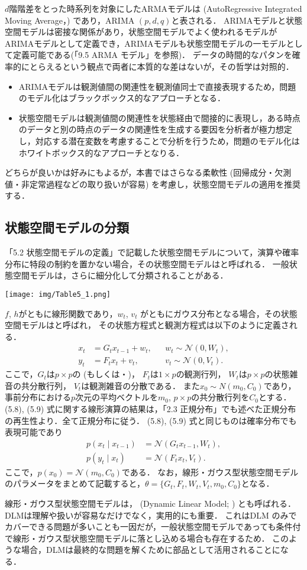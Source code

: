 \documentclass[11pt,a4paper]{jsarticle}
\numberwithin{equation}{section}
\begin{document}
$d$階階差をとった時系列を対象にしたARMAモデルは (AutoRegressive Integrated Moving Average，) であり，ARIMA $(p, d, q)$と表される．
ARIMAモデルと状態空間モデルは密接な関係があり，状態空間モデルでよく使われるモデルがARIMAモデルとして定義でき，ARIMAモデルも状態空間モデルの一モデルとして定義可能である(「9.5 ARMA モデル」を参照)．
データの時間的なパタンを確率的にとらえるという観点で両者に本質的な差はないが，その哲学は対照的．
\begin{itemize}
\item ARIMAモデルは観測値間の関連性を観測値同士で直接表現するため，問題のモデル化はブラックボックス的なアプローチとなる．
\item 状態空間モデルは観測値間の関連性を状態経由で間接的に表現し，ある時点のデータと別の時点のデータの関連性を生成する要因を分析者が極力想定し，対応する潜在変数を考慮することで分析を行うため，問題のモデル化はホワイトボックス的なアプローチとなりる．
\end{itemize}
どちらが良いかは好みにもよるが，本書ではさらなる柔軟性 (回帰成分・欠測値・非定常過程などの取り扱いが容易) を考慮し，状態空間モデルの適用を推奨する．

\subsection{状態空間モデルの分類}
「5.2 状態空間モデルの定義」で記載した状態空間モデルについて，演算や確率分布に特段の制約を置かない場合，その状態空間モデルはと呼ばれる．
一般状態空間モデルは，さらに細分化して分類されることがある．
\begin{center}
\texttt{[image: img/Table5\_1.png]}
\end{center}

$f$, $h$がともに線形関数であり，$w_t$, $v_t$ がともにガウス分布となる場合，その状態空間モデルはと呼ばれ，
その状態方程式と観測方程式は以下のように定義される．
\begin{align}
x_t
& =
G_t x_{t-1} + w_t, && w_t \sim \mathcal{N} (0, W_t), \\
y_t
& =
F_t x_t + v_t, && v_t \sim \mathcal{N} (0, V_t).
\end{align}
ここで，$G_t$は$p \times p$の (もしくは・)，
$F_t$は$1 \times p$の観測行列，
$W_t$は$p \times p$の状態雑音の共分散行列，
$V_t$は観測雑音の分散である．
また$x_0 \sim N(m_0, C_0)$であり，事前分布における$p$次元の平均ベクトルを$m_0$, $p \times p$の共分散行列を$C_0$とする．
(5.8), (5.9) 式に関する線形演算の結果は，「2.3 正規分布」でも述べた正規分布の再生性より．全て正規分布に従う．
(5.8), (5.9) 式と同じものは確率分布でも表現可能であり
\begin{align}
p(x_t \mid x_{t-1})
& =
\mathcal{N} (G_t x_{t-1}, W_t), \\
p(y_t \mid x_t)
& =
\mathcal{N} (F_t x_t, V_t).
\end{align}
ここで，$p(x_0) = \mathcal{N}(m_0, C_0)$である．
なお，線形・ガウス型状態空間モデルのパラメータをまとめて記載すると，$θ = \{ G_t, F_t, W_t, V_t, m_0, C_0 \}$となる．

線形・ガウス型状態空間モデルは， (Dynamic Linear Model; ) とも呼ばれる．
DLMは理解や扱いが容易なだけでなく，実用的にも重要．
これはDLM のみでカバーできる問題が多いことも一因だが，一般状態空間モデルであっても条件付で線形・ガウス型状態空間モデルに落とし込める場合も存在するため．
このような場合，DLMは最終的な問題を解くために部品として活用されることになる．
\end{document}
